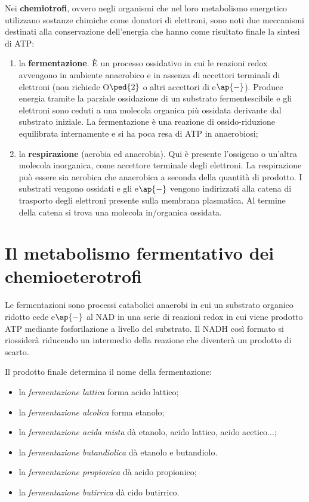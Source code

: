 \documentclass[11pt]{book}
\begin{document}
Nei \textbf{chemiotrofi}, ovvero negli organismi che nel loro metabolismo energetico utilizzano sostanze chimiche come donatori di elettroni, sono noti due meccanismi destinati alla conservazione dell'energia che hanno come risultato finale la sintesi di ATP:
\begin{enumerate}
\item la \textbf{fermentazione}. \`E un processo ossidativo in cui le reazioni redox avvengono in ambiente anaerobico e in assenza di accettori terminali di elettroni (non richiede O$\ped{2}$ o altri accettori di e$\ap{-}$). Produce energia tramite la parziale ossidazione di un substrato fermentescibile e gli elettroni sono ceduti a una molecola organica più ossidata derivante dal substrato iniziale. 
La fermentazione è una reazione di ossido-riduzione equilibrata internamente e si ha poca resa di ATP in anaerobiosi;
\item la \textbf{respirazione} (aerobia ed anaerobia). Qui è presente l’ossigeno o un’altra molecola inorganica, come accettore terminale degli elettroni. La respirazione può essere sia aerobica che anaerobica a seconda della quantità di prodotto. I substrati vengono ossidati e gli e$\ap{-}$ vengono indirizzati alla catena di trasporto degli elettroni presente sulla membrana plasmatica. Al termine della catena si trova una molecola in/organica ossidata.
\end{enumerate}


\section{Il metabolismo fermentativo dei chemioeterotrofi}
Le fermentazioni sono processi catabolici anaerobi in cui un substrato organico ridotto cede e$\ap{-}$ al NAD in una serie di reazioni redox in cui viene prodotto ATP mediante fosforilazione a livello del substrato. 
Il NADH così formato si riossiderà riducendo un intermedio della reazione che diventerà un prodotto di scarto. 

Il prodotto finale determina il nome della fermentazione:
\begin{itemize}
\item la \emph{fermentazione lattica} forma acido lattico;
\item la \emph{fermentazione alcolica} forma etanolo;
\item la \emph{fermentazione acida mista} dà etanolo, acido lattico, acido acetico...;
\item la \emph{fermentazione butandiolica} dà etanolo e butandiolo.
\item la \emph{fermentazione propionica} dà acido propionico;
\item la \emph{fermentazione butirrica} dà cido butirrico.
\end{itemize}
\end{document}
